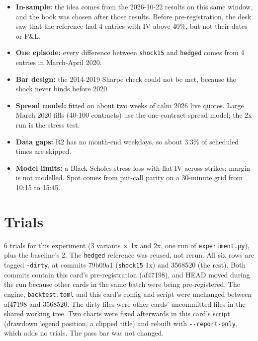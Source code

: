 \documentclass{article}
\begin{document}
\begin{itemize}

\item \textbf{In-sample:} the idea comes from the 2026-10-22 results on this same window, and the book was chosen after those results. Before pre-registration, the desk saw that the reference had 4 entries with IV above 40\%, but not their dates or P\&L.

\item \textbf{One episode:} every difference between \texttt{shock15} and \texttt{hedged} comes from 4 entries in March-April 2020.

\item \textbf{Bar design:} the 2014-2019 Sharpe check could not be met, because the shock never binds before 2020.

\item \textbf{Spread model:} fitted on about two weeks of calm 2026 live quotes. Large March 2020 fills (40-100 contracts) use the one-contract spread model; the 2x run is the stress test.

\item \textbf{Data gaps:} R2 has no month-end weekdays, so about 3.3\% of scheduled times are skipped.

\item \textbf{Model limits:} a Black-Scholes stress loss with flat IV across strikes; margin is not modelled. Spot comes from put-call parity on a 30-minute grid from 10:15 to 15:45.

\end{itemize}

\section{Trials}

6 trials for this experiment (3 variants \ensuremath{\times} 1x and 2x, one run of \texttt{experiment.\allowbreak{}py}), plus the baseline's 2. The \texttt{hedged} reference was reused, not rerun. All six rows are tagged \texttt{-\allowbreak{}dirty}, at commits 79b09a1 (\texttt{shock15} 1x) and 3568520 (the rest). Both commits contain this card's pre-registration (af47198), and HEAD moved during the run because other cards in the same batch were being pre-registered. The engine, \texttt{backtest.\allowbreak{}toml} and this card's config and script were unchanged between af47198 and 3568520. The dirty files were other cards' uncommitted files in the shared working tree. Two charts were fixed afterwards in this card's script (drawdown legend position, a clipped title) and rebuilt with \texttt{-\allowbreak{}-\allowbreak{}report-\allowbreak{}only}, which adds no trials. The pass bar was not changed.
\end{document}
